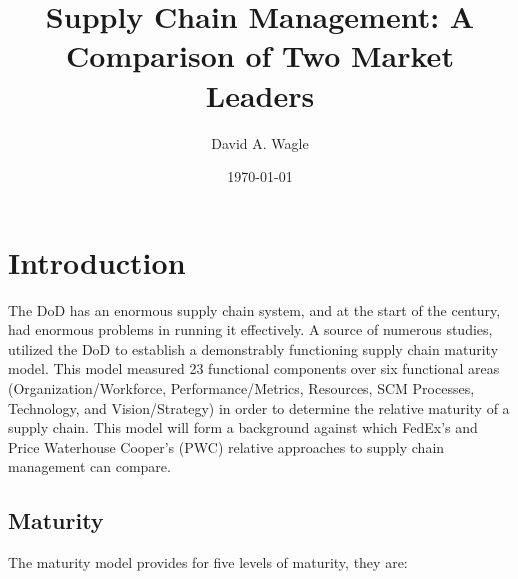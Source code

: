 \documentclass[man]{apa7}
\affiliation{North Central University}
\author{David A. Wagle}
\date{\today}
\title{Supply Chain Management: A Comparison of Two Market Leaders}
\begin{document}
\maketitle


\section{Introduction}
\label{sec:org1059743}

The DoD has an enormous supply chain system, and at the start of the century, had enormous problems in running it effectively. A source of numerous studies, \textcite{haraburdaSupplyChainManagemetn2017} utilized the DoD to establish a demonstrably functioning supply chain maturity model. This model measured 23 functional components over six functional areas (Organization/Workforce, Performance/Metrics, Resources, SCM Processes, Technology, and Vision/Strategy) in order to determine the relative maturity of a supply chain. This model will form a background against which FedEx's and Price Waterhouse Cooper's (PWC) relative approaches to supply chain management can compare.

\subsection{Maturity}
\label{sec:org14d4681}

The maturity model provides for five levels of maturity, they are:
\end{document}
